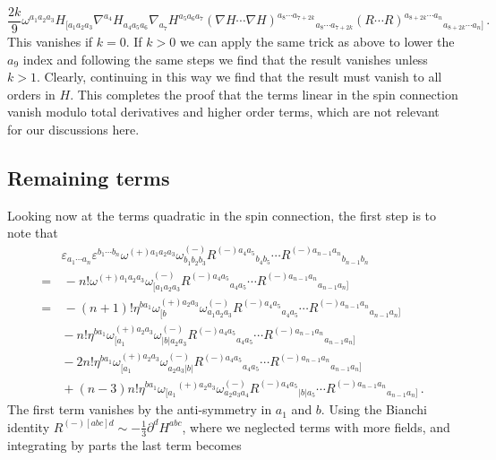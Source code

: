 \documentclass[a4paper,11pt]{article}
\begin{document}
\begin{equation}
\frac{2k}{9}\omega^{a_1a_2a_3}H_{[a_1a_2a_3}\nabla^{a_4}H_{a_4a_5a_6}\nabla_{a_7}H^{a_5a_6a_7}
\left(\nabla H\cdots\nabla H\right)^{a_8\cdots a_{7+2k}}{}_{a_8\cdots a_{7+2k}}
\left(R\cdots R\right)^{a_{8+2k}\cdots a_n}{}_{a_{8+2k}\cdots a_n]}\,.
\end{equation}
This vanishes if $k=0$. If $k>0$ we can apply the same trick as above to lower the $a_9$ index and following the same steps we find that the result vanishes unless $k>1$. Clearly, continuing in this way we find that the result must vanish to all orders in $H$. This completes the proof that the terms linear in the spin connection vanish modulo total derivatives and higher order terms, which are not relevant for our discussions here.


\subsection{Remaining terms}
Looking now at the terms quadratic in the spin connection, the first step is to note that
\begin{equation}
\begin{aligned}
&\varepsilon_{a_1\cdots a_n}\varepsilon^{b_1\cdots b_n}\omega^{(+)a_1a_2a_3}\omega^{(-)}_{b_1b_2b_3}R^{(-)a_4a_5}{}_{b_4b_5}\cdots R^{(-)a_{n-1}a_n}{}_{b_{n-1}b_n}
\\
=&\,{}
-n!
\omega^{(+)a_1a_2a_3}\omega^{(-)}_{[a_1a_2a_3}R^{(-)a_4a_5}{}_{a_4a_5}\cdots R^{(-)a_{n-1}a_n}{}_{a_{n-1}a_n]}
\\
=&\,{}
-(n+1)!\eta^{ba_1}\omega_{[b}^{(+)a_2a_3}\omega^{(-)}_{a_1a_2a_3}R^{(-)a_4a_5}{}_{a_4a_5}\cdots R^{(-)a_{n-1}a_n}{}_{a_{n-1}a_n]}
\\
&{}
-n!\eta^{ba_1}\omega_{[a_1}^{(+)a_2a_3}\omega^{(-)}_{|b|a_2a_3}R^{(-)a_4a_5}{}_{a_4a_5}\cdots R^{(-)a_{n-1}a_n}{}_{a_{n-1}a_n]}
\\
&{}
-2n!\eta^{ba_1}\omega_{[a_1}^{(+)a_2a_3}\omega^{(-)}_{a_2a_3|b|}R^{(-)a_4a_5}{}_{a_4a_5}\cdots R^{(-)a_{n-1}a_n}{}_{a_{n-1}a_n]}
\\
&{}
+(n-3)n!\eta^{ba_1}\omega_{[a_1}{}^{(+)a_2a_3}\omega^{(-)}_{a_2a_3a_4}R^{(-)a_4a_5}{}_{|b|a_5}\cdots R^{(-)a_{n-1}a_n}{}_{a_{n-1}a_n]}\,.
\end{aligned}
\end{equation}
The first term vanishes by the anti-symmetry in $a_1$ and $b$. Using the Bianchi identity $R^{(-)[abc]d}\sim-\frac13\partial^dH^{abc}$, where we neglected terms with more fields, and integrating by parts the last term becomes
\end{document}
